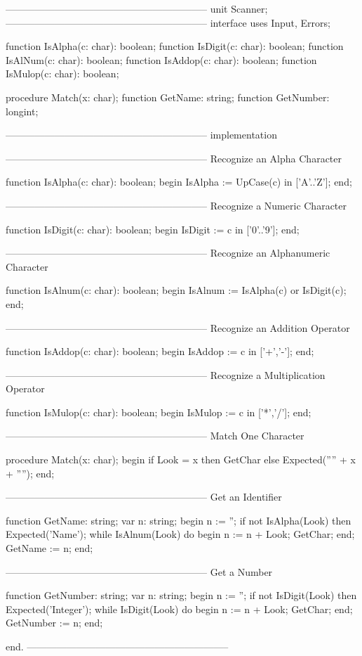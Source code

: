 \documentclass[float=false, crop=false]{standalone}
\begin{document}
\begin{code}
{--------------------------------------------------------------}
unit Scanner;
{--------------------------------------------------------------}
interface
uses Input, Errors;

function IsAlpha(c: char): boolean;
function IsDigit(c: char): boolean;
function IsAlNum(c: char): boolean;
function IsAddop(c: char): boolean;
function IsMulop(c: char): boolean;

procedure Match(x: char);
function GetName: string;
function GetNumber: longint;

{--------------------------------------------------------------}
implementation

{--------------------------------------------------------------}
{ Recognize an Alpha Character }

function IsAlpha(c: char): boolean;
begin
	IsAlpha := UpCase(c) in ['A'..'Z'];
end;

{--------------------------------------------------------------}
{ Recognize a Numeric Character }

function IsDigit(c: char): boolean;
begin
	IsDigit := c in ['0'..'9'];
end;

{--------------------------------------------------------------}
{ Recognize an Alphanumeric Character }

function IsAlnum(c: char): boolean;
begin
	IsAlnum := IsAlpha(c) or IsDigit(c);
end;

{--------------------------------------------------------------}
{ Recognize an Addition Operator }

function IsAddop(c: char): boolean;
begin
	IsAddop := c in ['+','-'];
end;

{--------------------------------------------------------------}
{ Recognize a Multiplication Operator }

function IsMulop(c: char): boolean;
begin
	IsMulop := c in ['*','/'];
end;

{--------------------------------------------------------------}
{ Match One Character }

procedure Match(x: char);
begin
	if Look = x then GetChar
	else Expected('''' + x + '''');
end;

{--------------------------------------------------------------}
{ Get an Identifier }

function GetName: string;
var n: string;
begin
	n := '';
	if not IsAlpha(Look) then Expected('Name');
	while IsAlnum(Look) do begin
		n := n + Look;
		GetChar;
	end;
	GetName := n;
end;

{--------------------------------------------------------------}
{ Get a Number }

function GetNumber: string;
var n: string;
begin
	n := '';
	if not IsDigit(Look) then Expected('Integer');
	while IsDigit(Look) do begin
		n := n + Look;
		GetChar;
	end;
	GetNumber := n;
end;

end.
{--------------------------------------------------------------}
\end{code}
\end{document}
